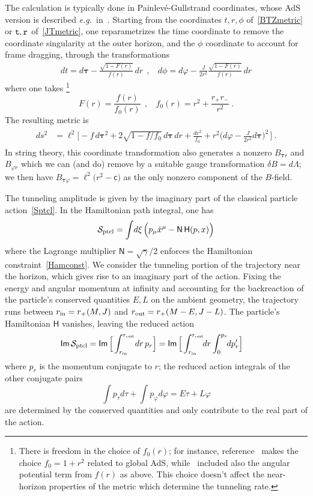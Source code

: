\documentclass[11pt]{article}
\newcommand{\rcite}{\cite}
\def\that{{\tt t}}
\def\rhat{{\tt r}}
\def\lapse{{ \sfN}}
\def\taub{{\boldsymbol\tau}}
\def\ptcl{{\rm ptcl}}
\def\tight#1{\! #1 \!}  %
\def\eg{{e.g.}}
\def\sfH{{\mathsf H}}
\def\sfI{{\mathsf I}}
\def\sfN{{\mathsf N}}
\def\sfc{{\mathsf c}}
\def\sfm{{\mathsf m}}
\def\Im{{\sfI\sfm\,}}
\def\be{\begin{equation}}
\def\ee{\end{equation}}
\numberwithin{equation}{section}
\def\cS{\mathcal {S}} \def\cT{\mathcal {T}} \def\cU{\mathcal {U}}
\def\eg{{\it e.g.}}
\def\eg{{\it e.g.}}
\begin{document}
The calculation is typically done in Painlev\'e-Gullstrand coordinates, whose AdS version is described \eg\ in~\rcite{Hemming:2000as,Wu:2006pz}.  Starting from the coordinates $t,r,\phi$ of~\eqref{BTZmetric} or $\that,\rhat$ of~\eqref{JTmetric}, one reparametrizes the time coordinate to remove the coordinate singularity at the outer horizon, and the $\phi$ coordinate to account for frame dragging, through the transformations
\begin{align}
\label{paincoords}
dt = d\taub- \frac{\sqrt{1-F(r)}}{f(r)}\, dr
~~,~~~~
d\phi = d\varphi - \frac{J}{2r^2}\frac{\sqrt{1-F(r)}}{f(r)}\, dr
\end{align}
where one takes%
\footnote{There is freedom in the choice of $f_0(r)$; for instance, reference~\rcite{Hemming:2000as} makes the choice $f_0=1+r^2$ related to global AdS, while~\rcite{Wu:2006pz} included also the angular potential term from $f(r)$ as above.  This choice doesn't affect the near-horizon properties of the metric which determine the  tunneling rate.}
\be
F(r)=\frac{f(r)}{f_0(r)}
~~,~~~~
f_0(r)=r^2 + \frac{r_+r_-}{r^2}  ~.
\ee
The resulting metric is
\begin{align}
\begin{split}
\label{Paincoords}
ds^2 &= \ell^2\Big[ -f\,d\taub^2 + 2\sqrt{1-f/f_0}\, d\taub\,dr + \frac{dr^2}{f_0} + r^2\Big( d\varphi-\frac{J}{2r^2} d\taub\Big)^2 \,\Big]  ~.
\end{split}
\end{align}
In string theory, this coordinate transformation also generates a nonzero $B_{\taub r}$ and $B_{\varphi r}$ which we can (and do) remove by a suitable gauge transformation $\delta B=d\Lambda$; we then have $B_{\taub\varphi} = \ell^2\big( r^2 \tight- \sfc\big)$ as the only nonzero component of the $B$-field.

The tunneling amplitude is given by the imaginary part of the classical particle action~\eqref{Sptcl}. 
In the Hamiltonian path integral, one has
\be
\cS_\ptcl = \int \!d\xi\, \Big( p_\mu \dot x^\mu - \lapse\, \sfH(p,x) \Big)
\ee
where the Lagrange multiplier $\lapse=\sqrt{\gamma}/2$ enforces the Hamiltonian constraint~\eqref{Hamconst}.
We consider the tunneling portion of the trajectory near the horizon, which gives rise to an imaginary part of the action.  
Fixing the energy and angular momentum at infinity and accounting for the backreaction of the particle's conserved quantities $E,L$ on the ambient geometry, the trajectory runs between $r_{\rm in}=r_+(M,J)$ and $r_{\rm out}=r_+(M-E ,J-L)$.
The particle's Hamiltonian $\sfH$ vanishes, leaving the reduced action
\begin{align}
\begin{split}
\label{ImS}
\Im \cS_\ptcl &= \Im \Big[ \int_{r_{\rm in}}^{r_{\rm out}} \! dr \, p_r  \Big] 
=  \Im \Big[ \int_{r_{\rm in}}^{r_{\rm out}} \! \!dr \int_0^{p_r} \!\!dp'_r  \Big] 
\end{split}
\end{align}
where $p_r$ is the momentum conjugate to $r$; the reduced action integrals of the other conjugate pairs
\be
\int p_{\tau} d\tau+ \int p_\varphi d\varphi = E  \tau+ L  \varphi
\ee
are determined by the conserved quantities and only contribute to the real part of the action.
\end{document}
